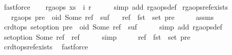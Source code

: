 \begin{isabellebody}
\ fastforce\isanewline
\ \ \isamarkupfalse%
\ {\isachardoublequoteopen}rga{\isacharunderscore}ops\ {\isacharparenleft}xs\ {\isacharat}\ {\isacharbrackleft}{\isacharparenleft}i{}{\isacharcomma}\ r{}{\isacharparenright}{\isacharbrackright}{\isacharparenright}{\isachardoublequoteclose}\isanewline
\ \ \ \ \isamarkupfalse%
\ {\isacharparenleft}simp\ add{\isacharcolon}\ rga{\isacharunderscore}ops{\isacharunderscore}def{\isacharparenright}\isanewline
{}\isamarkupfalse%
%
\endisatagproof
{\isafoldproof}%
%
\isadelimproof
\isanewline
%
\endisadelimproof
\isanewline
{}\isamarkupfalse%
\ rga{\isacharunderscore}ops{\isacharunderscore}ref{\isacharunderscore}exists{\isacharcolon}\isanewline
\ \ \ {\isachardoublequoteopen}rga{\isacharunderscore}ops\ {\isacharparenleft}pre\ {\isacharat}\ {\isacharparenleft}oid{\isacharcomma}\ Some\ ref{\isacharparenright}\ {\isacharhash}\ suf{\isacharparenright}{\isachardoublequoteclose}\isanewline
\ \ \ {\isachardoublequoteopen}ref\ {\isasymin}\ fst\ {\isacharbackquote}\ set\ pre{\isachardoublequoteclose}\isanewline
%
\isadelimproof
%
\endisadelimproof
%
\isatagproof
{}\isamarkupfalse%
\ {\isacharminus}\isanewline
\ \ \isamarkupfalse%
\ assms\ \isamarkupfalse%
\ {\isachardoublequoteopen}crdt{\isacharunderscore}ops\ set{\isacharunderscore}option\ {\isacharparenleft}pre\ {\isacharat}\ {\isacharparenleft}oid{\isacharcomma}\ Some\ ref{\isacharparenright}\ {\isacharhash}\ suf{\isacharparenright}{\isachardoublequoteclose}\isanewline
\ \ \ \ \isamarkupfalse%
\ {\isacharparenleft}simp\ add{\isacharcolon}\ rga{\isacharunderscore}ops{\isacharunderscore}def{\isacharparenright}\isanewline
\ \ \isamarkupfalse%
\ \isamarkupfalse%
\ {\isachardoublequoteopen}set{\isacharunderscore}option\ {\isacharparenleft}Some\ ref{\isacharparenright}\ {\isacharequal}\ {\isacharbraceleft}ref{\isacharbraceright}{\isachardoublequoteclose}\isanewline
\ \ \ \ \isamarkupfalse%
\ simp\isanewline
\ \ \isamarkupfalse%
\ \isamarkupfalse%
\ {\isachardoublequoteopen}ref\ {\isasymin}\ fst\ {\isacharbackquote}\ set\ pre{\isachardoublequoteclose}\isanewline
\ \ \ \ \isamarkupfalse%
\ crdt{\isacharunderscore}ops{\isacharunderscore}ref{\isacharunderscore}exists\ \isamarkupfalse%
\ fastforce\isanewline
{}\isamarkupfalse%
%
\endisatagproof
{\isafoldproof}%
%
\isadelimproof

\end{isabellebody}
